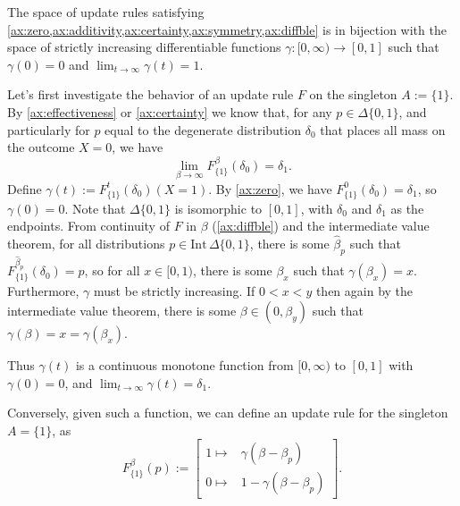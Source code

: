 \documentclass{article}
\begin{document}
\begin{claim}
The space of update rules satisfying
\cref{ax:zero,ax:additivity,ax:certainty,ax:symmetry,ax:diffble}
is in bijection with the space of strictly increasing differentiable functions
$\gamma : [0,\infty) \to [0,1]$
such that
$\gamma(0) = 0$ and $\lim_{t\to\infty}\gamma(t) = 1$.
\end{claim}
\begin{lproof}
    Let's first investigate the behavior of an update rule $F$ on the singleton $A := \{1\}$.
    By \ref{ax:effectiveness} or \cref{ax:certainty} we know that, for any $p \in \Delta\{0,1\}$, and particularly for $p$ equal to the degenerate distribution $\delta_0$ that places all mass on the outcome $X=0$, we have
    \[
        \lim_{\beta \to \infty} F^\beta_{\{1\}}(\delta_0) = \delta_1.
    \]
    Define $\gamma(t) := F^{t}_{\{1\}}(\delta_0)(X=1)$.
    By \cref{ax:zero}, we have $F^0_{\{1\}}(\delta_0) = \delta_1$, so $\gamma(0) = 0$.
    Note that $\Delta\{0,1\}$ is isomorphic to $[0,1]$, with $\delta_0$ and $\delta_1$ as the endpoints.
    From continuity of $F$ in $\beta$ (\cref{ax:diffble}) and the intermediate value theorem, for all distributions $p \in \mathrm{Int}\, \Delta\{0,1\}$, there is some $\hat\beta_p$ such that
    $F^{\hat\beta_p}_{\{1\}}(\delta_0) = p$, so for all $x \in [0,1)$, there is some $\beta_x$ such that $\gamma(\beta_x) = x$.
    Furthermore, $\gamma$ must be strictly increasing.
    If
    $0 < x < y$ then again by the intermediate value theorem, there is some $\beta \in (0, \beta_y)$
    such that $\gamma(\beta) = x = \gamma(\beta_x)$.

    \TODO{}

    Thus $\gamma(t) $ is a continuous monotone function from $[0,\infty)$ to $[0,1]$ with $\gamma(0) = 0$,
    and $\lim_{t\to\infty} \gamma(t) = \delta_1$.


    Conversely, given such a function, we can define an update rule for the singleton $A = \{1\}$, as
    \[
        F^{\beta}_{\{1\}}(p) :=
        \begin{bmatrix}
            1 \mapsto& \gamma(\beta - \beta_p) \\
            0 \mapsto& 1-\gamma(\beta - \beta_p)
        \end{bmatrix}.
    \]
\end{lproof}
\end{document}
